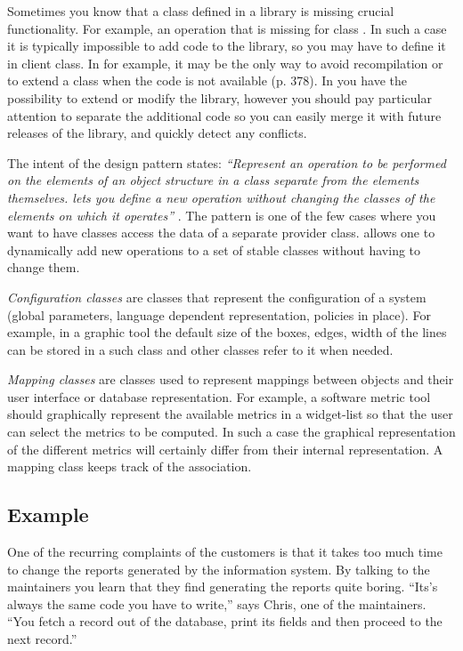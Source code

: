 \documentclass[a4paper,10pt,twoside]{book}
\begin{document}
Sometimes you know that a class defined in a library is missing crucial functionality. For example, an operation  that is missing for class . In such a case it is typically impossible to add code to the library, so you may have to define it in client class. In  for example, it may be the only way to avoid recompilation or to extend a class when the code is not available \cite{Alpe98a} (p. 378). In  you have the possibility to extend or modify the library, however you should pay particular attention to separate the additional code so you can easily merge it with future releases of the library, and quickly detect any conflicts. 

The intent of the  design pattern states: \emph{``Represent an operation to be performed on the elements of an object structure in a class separate from the elements themselves.  lets you define a new operation without changing the classes of the elements on which it operates''} \cite{Gamm95a}. The  pattern is one of the few cases where you want to have classes access the data of a separate provider class.  allows one to dynamically add new operations to a set of stable classes without having to change them. 

\emph{Configuration classes} are classes that represent the configuration of a system (\eg global parameters, language dependent representation, policies in place). For example, in a graphic tool the default size of the boxes, edges, width of the lines can be stored in a such class and other classes refer to it when needed. 

\emph{Mapping classes} are classes used to represent mappings between objects and their user interface or database representation. For example, a software metric tool should graphically represent the available metrics in a widget-list so that the user can select the metrics to be computed. In such a case the graphical representation of the different metrics will certainly differ from their internal representation. A mapping class keeps track of the association.

\subsection*{Example}

One of the recurring complaints of the customers is that it takes too much time to change the reports generated by the information system. By talking to the maintainers you learn that they find generating the reports quite boring. ``Its's always the same code you have to write,'' says Chris, one of the maintainers. ``You fetch a record out of the database, print its fields and then proceed to the next record.'' 
\end{document}
